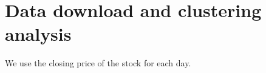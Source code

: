 \section{Data download and clustering analysis}

We use the closing price of the stock for each day.